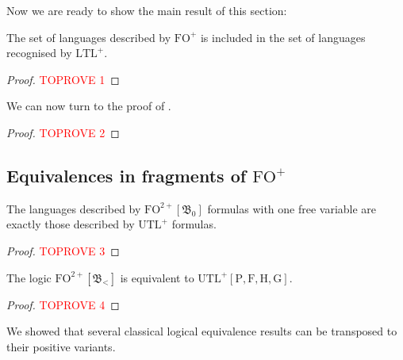 \documentclass[a4paper,UKenglish,cleveref, autoref, thm-restate]{lipics-v2021}
\newcommand{\FO}{\mathrm{FO}}
\newcommand{\FOp}{\FO^+}
\newcommand{\FOtwp}{\FO^{2+}}
\newcommand{\LTL}{\mathrm{LTL}}
\newcommand{\LTLp}{\LTL^+}
\newcommand{\UTL}{\mathrm{UTL}}
\newcommand{\UTLp}{\UTL^+}
\renewcommand{\P}{\mathrm{P}}
\newcommand{\F}{\mathrm{F}}
\renewcommand{\H}{\mathrm{H}}
\newcommand{\G}{\mathrm{G}}
\newcommand{\bin}{\mathfrak{B}}
\begin{document}
Now we are ready to show the main result of this section:


\begin{lemma}\label{FOtoLTL}
    The set of languages described by $\FOp$ is included in the set of languages recognised by $\LTLp$.
\end{lemma}





\begin{proof}\textcolor{red}{TOPROVE 1}\end{proof}
We can now turn to the proof of .


\begin{proof}\textcolor{red}{TOPROVE 2}\end{proof}




\subsection{\texorpdfstring{Equivalences in fragments of $\FOp$}{Equivalences in fragments of FO+}} \label{sec:equivfrag}



\begin{theorem}\label{equiv2}
    The languages described by $\FOtwp[\bin_0]$ formulas with one free variable are exactly those described by $\UTLp$ formulas.
\end{theorem}


\begin{proof}\textcolor{red}{TOPROVE 3}\end{proof}





\begin{corollary} \label{coro:equiv2withoutX}
    The logic $\FOtwp[\bin_<]$ is equivalent to $\UTLp[\P,\F,\H,\G]$.
\end{corollary}

\begin{proof}\textcolor{red}{TOPROVE 4}\end{proof}




We showed that several classical logical equivalence results can be transposed to their positive variants.
\end{document}
